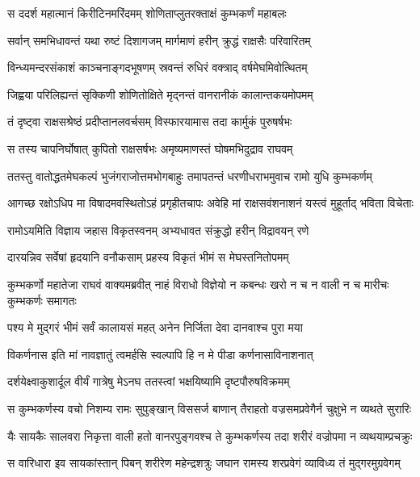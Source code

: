 \twolineshloka
{स ददर्श महात्मानं किरीटिनमरिंदमम्}
{शोणिताप्लुतरक्ताक्षं कुम्भकर्णं महाबलः} %

\twolineshloka
{सर्वान् समभिधावन्तं यथा रुष्टं दिशागजम्}
{मार्गमाणं हरीन् क्रुद्धं राक्षसैः परिवारितम्} %

\twolineshloka
{विन्ध्यमन्दरसंकाशं काञ्चनाङ्गदभूषणम्}
{स्रवन्तं रुधिरं वक्त्राद् वर्षमेघमिवोत्थितम्} %

\twolineshloka
{जिह्वया परिलिह्यन्तं सृक्किणी शोणितोक्षिते}
{मृद्नन्तं वानरानीकं कालान्तकयमोपमम्} %

\twolineshloka
{तं दृष्ट्वा राक्षसश्रेष्ठं प्रदीप्तानलवर्चसम्}
{विस्फारयामास तदा कार्मुकं पुरुषर्षभः} %

\twolineshloka
{स तस्य चापनिर्घोषात् कुपितो राक्षसर्षभः}
{अमृष्यमाणस्तं घोषमभिदुद्राव राघवम्} %

\twolineshloka
{ततस्तु वातोद्धतमेघकल्पं भुजंगराजोत्तमभोगबाहुः}
{तमापतन्तं धरणीधराभमुवाच रामो युधि कुम्भकर्णम्} %

\twolineshloka
{आगच्छ रक्षोऽधिप मा विषादमवस्थितोऽहं प्रगृहीतचापः}
{अवेहि मां राक्षसवंशनाशनं यस्त्वं मुहूर्ताद् भविता विचेताः} %

\twolineshloka
{रामोऽयमिति विज्ञाय जहास विकृतस्वनम्}
{अभ्यधावत संक्रुद्धो हरीन् विद्रावयन् रणे} %

\twolineshloka
{दारयन्निव सर्वेषां हृदयानि वनौकसाम्}
{प्रहस्य विकृतं भीमं स मेघस्तनितोपमम्} %

\threelineshloka
{कुम्भकर्णो महातेजा राघवं वाक्यमब्रवीत्}
{नाहं विराधो विज्ञेयो न कबन्धः खरो न च}
{न वाली न च मारीचः कुम्भकर्णः समागतः} %

\twolineshloka
{पश्य मे मुद्गरं भीमं सर्वं कालायसं महत्}
{अनेन निर्जिता देवा दानवाश्च पुरा मया} %

\twolineshloka
{विकर्णनास इति मां नावज्ञातुं त्वमर्हसि}
{स्वल्पापि हि न मे पीडा कर्णनासाविनाशनात्} %

\twolineshloka
{दर्शयेक्ष्वाकुशार्दूल वीर्यं गात्रेषु मेऽनघ}
{ततस्त्वां भक्षयिष्यामि दृष्टपौरुषविक्रमम्} %

\twolineshloka
{स कुम्भकर्णस्य वचो निशम्य रामः सुपुङ्खान् विससर्ज बाणान्}
{तैराहतो वज्रसमप्रवेगैर्न चुक्षुभे न व्यथते सुरारिः} %

\twolineshloka
{यैः सायकैः सालवरा निकृत्ता वाली हतो वानरपुङ्गवश्च}
{ते कुम्भकर्णस्य तदा शरीरं वज्रोपमा न व्यथयाम्प्रचक्रुः} %

\twolineshloka
{स वारिधारा इव सायकांस्तान् पिबन् शरीरेण महेन्द्रशत्रुः}
{जघान रामस्य शरप्रवेगं व्याविध्य तं मुद्गरमुग्रवेगम्} %

